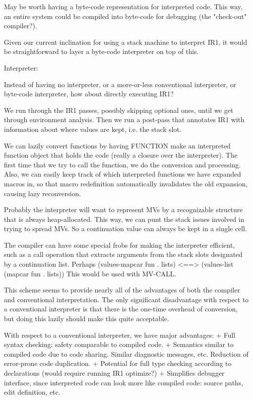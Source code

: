 
May be worth having a byte-code representation for interpreted code.  This way,
an entire system could be compiled into byte-code for debugging (the
"check-out" compiler?).

Given our current inclination for using a stack machine to interpret IR1, it
would be straightforward to layer a byte-code interpreter on top of this.


Interpreter:

Instead of having no interpreter, or a more-or-less conventional interpreter,
or byte-code interpreter, how about directly executing IR1?

We run through the IR1 passes, possibly skipping optional ones, until we get
through environment analysis.  Then we run a post-pass that annotates IR1 with
information about where values are kept, i.e. the stack slot.

We can lazily convert functions by having FUNCTION make an interpreted function
object that holds the code (really a closure over the interpreter).  The first
time that we try to call the function, we do the conversion and processing.
Also, we can easily keep track of which interpreted functions we have expanded
macros in, so that macro redefinition automatically invalidates the old
expansion, causing lazy reconversion.

Probably the interpreter will want to represent MVs by a recognizable structure
that is always heap-allocated.  This way, we can punt the stack issues involved
in trying to spread MVs.  So a continuation value can always be kept in a
single cell.

The compiler can have some special frobs for making the interpreter efficient,
such as a call operation that extracts arguments from the stack
slots designated by a continuation list.  Perhaps 
    (values-mapcar fun . lists)
<==>
    (values-list (mapcar fun . lists))
This would be used with MV-CALL.


This scheme seems to provide nearly all of the advantages of both the compiler
and conventional interpretation.  The only significant disadvantage with
respect to a conventional interpreter is that there is the one-time overhead of
conversion, but doing this lazily should make this quite acceptable.

With respect to a conventional interpreter, we have major advantages:
 + Full syntax checking: safety comparable to compiled code.
 + Semantics similar to compiled code due to code sharing.  Similar diagnostic
   messages, etc.  Reduction of error-prone code duplication.
 + Potential for full type checking according to declarations (would require
   running IR1 optimize?)
 + Simplifies debugger interface, since interpreted code can look more like
   compiled code: source paths, edit definition, etc.

